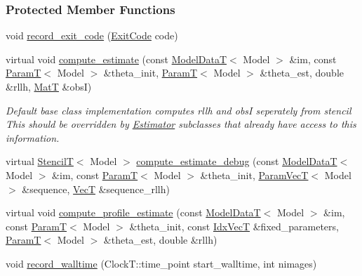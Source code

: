 \subsubsection*{Protected Member Functions}
\begin{DoxyCompactItemize}
\item 
void \hyperlink{classmappel_1_1ThreadedEstimator_a8fefc448211f9caa3612ba4f34b006ab}{record\+\_\+exit\+\_\+code} (\hyperlink{classmappel_1_1Estimator_a6d599915907ba4d0607fcb958d231edc}{Exit\+Code} code)
\item 
virtual void \hyperlink{classmappel_1_1Estimator_aa46d86cfb5c336c9cb8c106da036d7d1}{compute\+\_\+estimate} (const \hyperlink{namespacemappel_a97f050df953605381ae9c901c3b125f1}{Model\+DataT}$<$ Model $>$ \&im, const \hyperlink{namespacemappel_a667925cb0d6c0e49f2f035cc5a9a6857}{ParamT}$<$ Model $>$ \&theta\+\_\+init, \hyperlink{namespacemappel_a667925cb0d6c0e49f2f035cc5a9a6857}{ParamT}$<$ Model $>$ \&theta\+\_\+est, double \&rllh, \hyperlink{namespacemappel_a7091ab87c528041f7e2027195fad8915}{MatT} \&obsI)
\begin{DoxyCompactList}\small\item\em Default base class implementation computes rllh and obsI seperately from stencil This should be overridden by \hyperlink{classmappel_1_1Estimator}{Estimator} subclasses that already have access to this information. \end{DoxyCompactList}\item 
virtual \hyperlink{namespacemappel_a3a06598240007876f8c4bf834ad86197}{StencilT}$<$ Model $>$ \hyperlink{classmappel_1_1Estimator_a29c41d423941e8b86add3e493cb1375e}{compute\+\_\+estimate\+\_\+debug} (const \hyperlink{namespacemappel_a97f050df953605381ae9c901c3b125f1}{Model\+DataT}$<$ Model $>$ \&im, const \hyperlink{namespacemappel_a667925cb0d6c0e49f2f035cc5a9a6857}{ParamT}$<$ Model $>$ \&theta\+\_\+init, \hyperlink{namespacemappel_a0f86d3153e4e27b095012f140eea58de}{Param\+VecT}$<$ Model $>$ \&sequence, \hyperlink{namespacemappel_a2225ad69f358daa3f4f99282a35b9a3a}{VecT} \&sequence\+\_\+rllh)
\item 
virtual void \hyperlink{classmappel_1_1Estimator_a273f65624e06688cd4b1126e3e7556ae}{compute\+\_\+profile\+\_\+estimate} (const \hyperlink{namespacemappel_a97f050df953605381ae9c901c3b125f1}{Model\+DataT}$<$ Model $>$ \&im, const \hyperlink{namespacemappel_a667925cb0d6c0e49f2f035cc5a9a6857}{ParamT}$<$ Model $>$ \&theta\+\_\+init, const \hyperlink{namespacemappel_ac63743dcd42180127307cd0e4ecdd784}{Idx\+VecT} \&fixed\+\_\+parameters, \hyperlink{namespacemappel_a667925cb0d6c0e49f2f035cc5a9a6857}{ParamT}$<$ Model $>$ \&theta\+\_\+est, double \&rllh)
\item 
void \hyperlink{classmappel_1_1Estimator_a50125572d3b87ebcf1ffb27a8d8c643d}{record\+\_\+walltime} (Clock\+T\+::time\+\_\+point start\+\_\+walltime, int nimages)
\end{DoxyCompactItemize}
